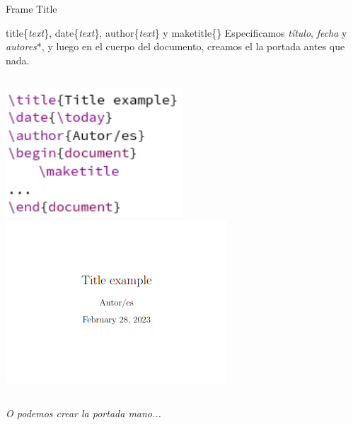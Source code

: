 \begin{frame}{Frame Title}

    \begin{block}{title\{\textit{text}\}, date\{\textit{text}\}, author\{\textit{text}\} y maketitle\{\}}
    Especificamos \textit{título}, \textit{fecha} y \textit{autores}*, y luego en el cuerpo del documento, creamos el la portada antes que nada.
    \end{block}

    \pause
    
    \begin{columns}
            \hspace{1.5cm}\includegraphics[width=0.5\textwidth]{images/make_title.png}
        \pause
            \includegraphics[width=\textwidth]{images/make_title_res.png}
    \end{columns}

    \pause

    \centering
    \textit{O podemos crear la portada mano...}

\end{frame}